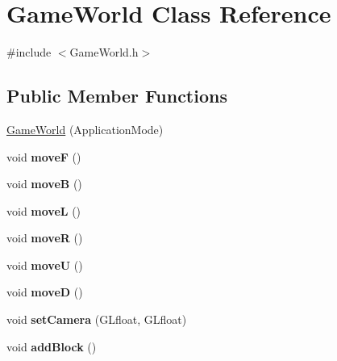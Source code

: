 \hypertarget{classGameWorld}{}\section{Game\+World Class Reference}
\label{classGameWorld}


{\ttfamily \#include $<$Game\+World.\+h$>$}

\subsection*{Public Member Functions}
\begin{DoxyCompactItemize}
\item 
\hyperlink{classGameWorld_a17a84e57a80600961088afc753036f89}{Game\+World} (Application\+Mode)
\item 
void {\bfseries moveF} ()\hypertarget{classGameWorld_a4e3d5cbb6241c8db5d7e74af509a02c1}{}\label{classGameWorld_a4e3d5cbb6241c8db5d7e74af509a02c1}

\item 
void {\bfseries moveB} ()\hypertarget{classGameWorld_a1c5c6bd707c87d80573e558ab8ce018a}{}\label{classGameWorld_a1c5c6bd707c87d80573e558ab8ce018a}

\item 
void {\bfseries moveL} ()\hypertarget{classGameWorld_af1728ec61cd2016030821261c8f79c34}{}\label{classGameWorld_af1728ec61cd2016030821261c8f79c34}

\item 
void {\bfseries moveR} ()\hypertarget{classGameWorld_ab59dfdd281fac21eb6f2680711188598}{}\label{classGameWorld_ab59dfdd281fac21eb6f2680711188598}

\item 
void {\bfseries moveU} ()\hypertarget{classGameWorld_a219d46bb16bfb526bcf9b6957515d063}{}\label{classGameWorld_a219d46bb16bfb526bcf9b6957515d063}

\item 
void {\bfseries moveD} ()\hypertarget{classGameWorld_a32b9c8230ef13f29e03f38b43e015ad9}{}\label{classGameWorld_a32b9c8230ef13f29e03f38b43e015ad9}

\item 
void {\bfseries set\+Camera} (G\+Lfloat, G\+Lfloat)\hypertarget{classGameWorld_a71f6a1467ce47501dbcafd5a2cbfb1a2}{}\label{classGameWorld_a71f6a1467ce47501dbcafd5a2cbfb1a2}

\item 
void {\bfseries add\+Block} ()\hypertarget{classGameWorld_af5b68a2455b69878be6f0180837d9ce0}{}\label{classGameWorld_af5b68a2455b69878be6f0180837d9ce0}


\end{DoxyCompactItemize}
